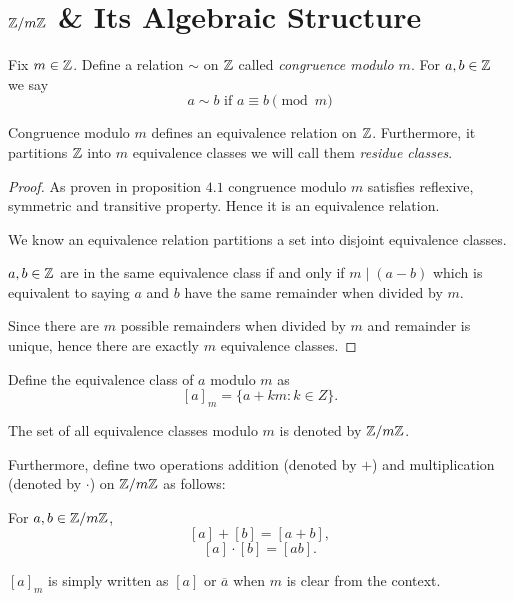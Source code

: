 \section{\texorpdfstring{\boldmath $\Z/m\Z$}{Z/mZ} \& Its Algebraic Structure}
\begin{definition}
    Fix $m \in \mathbb{Z}$. Define a relation $\sim$ on $\mathbb{Z}$ called \textit{congruence modulo $m$}. For $a, b \in \mathbb{Z}$ we say
    \[a \sim b \text{ if } a \equiv b \pmod{m}\]
\end{definition}
\begin{lemma}
    Congruence modulo $m$ defines an equivalence relation on $\mathbb{Z}$. Furthermore, it partitions $\mathbb{Z}$ into $m$ equivalence classes we will call them \textit{residue classes}.
\end{lemma}
\begin{proof}
    As proven in proposition $4.1$ congruence modulo $m$ satisfies reflexive, symmetric and transitive property. Hence it is an equivalence relation.

    We know an equivalence relation partitions a set into disjoint equivalence classes.

    $a, b \in \mathbb{Z}$ are in the same equivalence class if and only if $m \mid (a-b)$ which is equivalent to saying $a$ and $b$ have the same remainder when divided by $m$.

    Since there are $m$ possible remainders when divided by $m$ and remainder is unique, hence there are exactly $m$ equivalence classes.
\end{proof}
\begin{definition}[$\Z/m\Z$]
    Define the equivalence class of $a$ modulo $m$ as \[[a]_m = \{a + km : k \in Z\}.\]

    The set of all equivalence classes modulo $m$ is denoted by $\Z/m\Z$.

    Furthermore, define two operations addition (denoted by $+$) and multiplication (denoted by $\cdot$) on $\Z/m\Z$ as follows:

    For $a, b \in \mathbb{Z}/m\mathbb{Z}$, \[[a] + [b] = [a+b],\] \[[a] \cdot [b] = [ab].\]
\end{definition}
\begin{notation}
    $[a]_m$ is simply written as $[a]$ or $\overline{a}$ when $m$ is clear from the context.
\end{notation}

